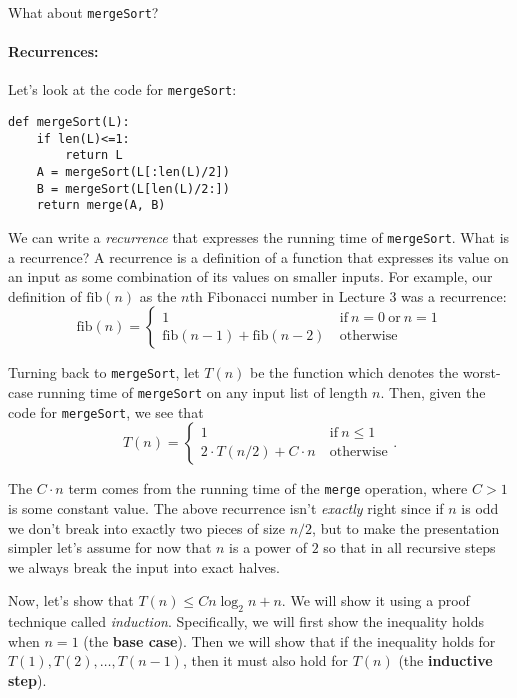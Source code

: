 \documentclass[11pt]{article}
\begin{document}
What about \texttt{mergeSort}?

\paragraph{Recurrences:}

Let's look at the code for \texttt{mergeSort}:
\begin{verbatim}
def mergeSort(L):
    if len(L)<=1:
        return L
    A = mergeSort(L[:len(L)/2])
    B = mergeSort(L[len(L)/2:])
    return merge(A, B)
\end{verbatim}

We can write a {\em recurrence} that expresses the running time of
\texttt{mergeSort}.  What is a recurrence?  A recurrence is a
definition of a function that expresses its value on an input as some
combination of its values on smaller inputs.  For example, our
definition of $\mathrm{fib}(n)$ as the $n$th Fibonacci number in
Lecture 3 was a recurrence:
$$
\mathrm{fib}(n) = \begin{cases} 1 \ &
  \mathrm{if}\ n=0\ \mathrm{or}\ n = 1
\\ \mathrm{fib}(n-1) + \mathrm{fib}(n-2) \
&\mathrm{otherwise} \end{cases}
$$

Turning back to \texttt{mergeSort}, let $T(n)$ be the function which
denotes the worst-case running time of \texttt{mergeSort} on any input
list of length $n$.  Then, given the code for \texttt{mergeSort}, we
see that
$$
T(n) = \begin{cases} 1 \ &
  \mathrm{if}\ n\le 1
\\ 2\cdot T(n/2) + C\cdot n \
&\mathrm{otherwise} \end{cases} .
$$

The $C\cdot n$ term comes from the running time of the
\texttt{merge} operation, where $C>1$ is some constant value.
The above recurrence isn't {\em exactly} right since if $n$ is odd we
don't break into exactly two pieces of size $n/2$, but to make the
presentation simpler let's assume
for now that $n$ is a power of $2$ so that in all recursive steps we
always break the input into exact halves.

Now, let's show that $T(n) \le  Cn\log_2 n + n$. We will show it using a proof technique called {\em induction}. Specifically, we will first show the inequality holds when $n=1$ (the \textbf{base case}). Then we will show that if the inequality holds for $T(1), T(2),\ldots, T(n-1)$, then it must also hold for $T(n)$ (the \textbf{inductive step}).
\end{document}

